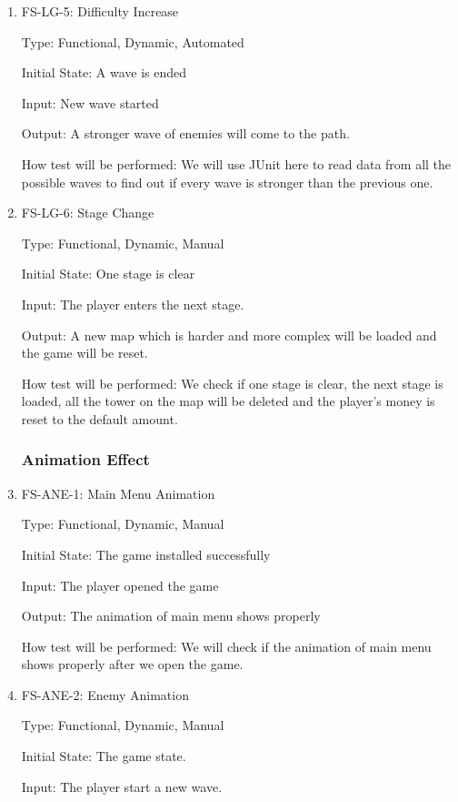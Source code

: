 \documentclass[12pt]{article}
\begin{document}
\begin{enumerate}
	\item{FS-LG-5: Difficulty Increase}
	
	Type: Functional, Dynamic, Automated
	
	Initial State: A wave is ended
	
	Input: New wave started
	
	Output: A stronger wave of enemies will come to the path.
	
	How test will be performed: We will use JUnit here to read data from all the possible waves to find out if every wave is stronger than the previous one.

    \item{FS-LG-6: Stage Change}
	
	Type: Functional, Dynamic, Manual
	
	Initial State: One stage is clear
	
	Input: The player enters the next stage.
	
	Output: A new map which is harder and more complex will be loaded and the game will be reset.
	
	How test will be performed: We check if one stage is clear, the next stage is loaded, all the tower on the map will be deleted and the player's money is reset to the default amount.

    
    
	\subsubsection{Animation Effect}
					
					
	\item{FS-ANE-1: Main Menu Animation}
					
	Type: Functional, Dynamic, Manual
					
	Initial State: The game installed successfully
					
	Input: The player opened the game
					
	Output: The animation of main menu shows properly
					
	How test will be performed: We will check if the animation of main menu shows properly after we open the game.
    
    \item{FS-ANE-2: Enemy Animation}
    
    Type: Functional, Dynamic, Manual
    
    Initial State: The game state.
    
    Input: The player start a new wave.
    

\end{enumerate}
\end{document}
